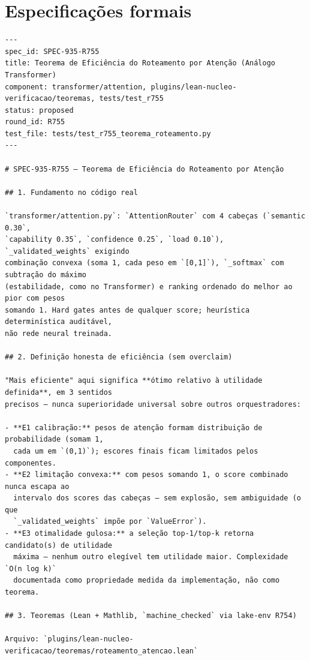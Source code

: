 \documentclass[12pt,openany,oneside,a4paper,brazil,chapter=TITLE]{abntex2}
\begin{document}
\begin{SingleSpacing}
\end{SingleSpacing}
\chapter{Especificações formais}
\label{ap:specs}

\begin{lstlisting}
---
spec_id: SPEC-935-R755
title: Teorema de Eficiência do Roteamento por Atenção (Análogo Transformer)
component: transformer/attention, plugins/lean-nucleo-verificacao/teoremas, tests/test_r755
status: proposed
round_id: R755
test_file: tests/test_r755_teorema_roteamento.py
---

# SPEC-935-R755 — Teorema de Eficiência do Roteamento por Atenção

## 1. Fundamento no código real

`transformer/attention.py`: `AttentionRouter` com 4 cabeças (`semantic 0.30`,
`capability 0.35`, `confidence 0.25`, `load 0.10`), `_validated_weights` exigindo
combinação convexa (soma 1, cada peso em `[0,1]`), `_softmax` com subtração do máximo
(estabilidade, como no Transformer) e ranking ordenado do melhor ao pior com pesos
somando 1. Hard gates antes de qualquer score; heurística determinística auditável,
não rede neural treinada.

## 2. Definição honesta de eficiência (sem overclaim)

"Mais eficiente" aqui significa **ótimo relativo à utilidade definida**, em 3 sentidos
precisos — nunca superioridade universal sobre outros orquestradores:

- **E1 calibração:** pesos de atenção formam distribuição de probabilidade (somam 1,
  cada um em `(0,1)`); escores finais ficam limitados pelos componentes.
- **E2 limitação convexa:** com pesos somando 1, o score combinado nunca escapa ao
  intervalo dos scores das cabeças — sem explosão, sem ambiguidade (o que
  `_validated_weights` impõe por `ValueError`).
- **E3 otimalidade gulosa:** a seleção top-1/top-k retorna candidato(s) de utilidade
  máxima — nenhum outro elegível tem utilidade maior. Complexidade `O(n log k)`
  documentada como propriedade medida da implementação, não como teorema.

## 3. Teoremas (Lean + Mathlib, `machine_checked` via lake-env R754)

Arquivo: `plugins/lean-nucleo-verificacao/teoremas/roteamento_atencao.lean`


\end{lstlisting}
\end{document}
